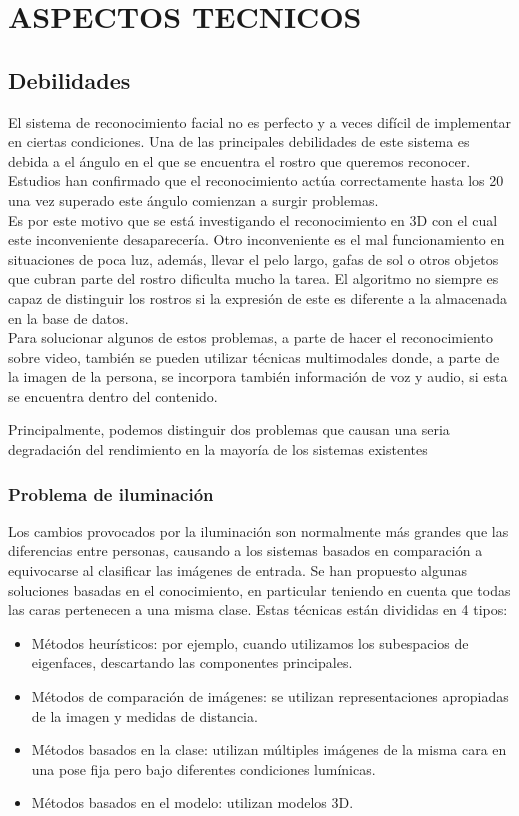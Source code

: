 \documentclass[a4paper,11pt]{article}
\begin{document}
 \section{ASPECTOS TECNICOS}
 \subsection{Debilidades}
 El sistema de reconocimiento facial no es perfecto y a veces difícil de implementar en ciertas condiciones. Una de las principales debilidades de este sistema es debida a el ángulo en el que se encuentra el rostro que queremos reconocer. Estudios han confirmado que el reconocimiento actúa correctamente hasta los 20 una vez superado este ángulo comienzan a surgir problemas.\\
 Es por este motivo que se está investigando el reconocimiento en 3D con el cual este inconveniente desaparecería. Otro inconveniente es el mal funcionamiento en situaciones de poca luz, además, llevar el pelo largo, gafas de sol o otros objetos que cubran parte del rostro dificulta mucho la tarea. El algoritmo no siempre es capaz de distinguir los rostros si la expresión de este es diferente a la almacenada en la base de datos.\\
 
 Para solucionar algunos de estos problemas, a parte de hacer el reconocimiento sobre video, también se pueden utilizar técnicas multimodales donde, a parte de la imagen de la persona, se incorpora también información de voz y audio, si esta se encuentra dentro del contenido.
 
 Principalmente, podemos distinguir dos problemas que causan una seria degradación del rendimiento en la mayoría de los sistemas existentes\\
 \subsubsection{Problema de iluminación}
 Los cambios provocados por la iluminación son normalmente más grandes que las diferencias entre personas, causando a los sistemas basados en comparación a equivocarse al clasificar las imágenes de entrada. Se han propuesto algunas soluciones basadas en el conocimiento, en particular teniendo en cuenta que todas las caras pertenecen a una misma clase. Estas técnicas están divididas en 4 tipos:\\
 \begin{itemize}
    \item 	Métodos heurísticos: por ejemplo, cuando utilizamos los subespacios de eigenfaces, descartando las componentes principales.
	\item Métodos de comparación de imágenes: se utilizan representaciones apropiadas de la imagen y medidas de distancia.
	\item Métodos basados en la clase: utilizan múltiples imágenes de la misma cara en una pose fija pero bajo diferentes condiciones lumínicas.
	\item  Métodos basados en el modelo: utilizan modelos 3D.
 \end{itemize}
 
\end{document}
